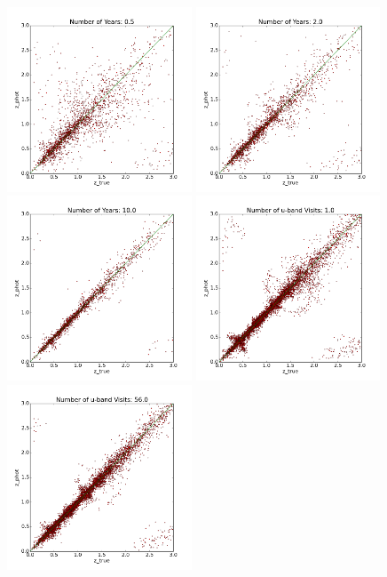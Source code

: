 \begin{figure}[h]
\begin{center}
\includegraphics[width=5.5cm]{figs/photoz/nyears_cat05.png}
\includegraphics[width=5.5cm]{figs/photoz/nyears_cat20.png}
\includegraphics[width=5.5cm]{figs/photoz/nyears_cat100.png}
\includegraphics[width=5.5cm]{figs/photoz/uvisits_cat1.png}
\includegraphics[width=5.5cm]{figs/photoz/uvisits_cat4.png}

\end{center}
\end{figure}

